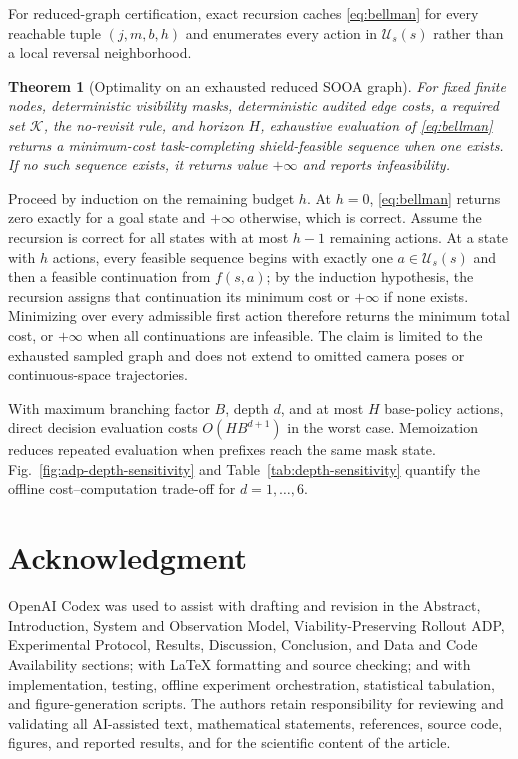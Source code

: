 \documentclass{IEEEtaes}
\newtheorem{theorem}{Theorem}
\theoremstyle{remark}
\theoremstyle{plain}
\begin{document}
For reduced-graph certification, exact recursion caches \eqref{eq:bellman} for every reachable tuple $(j,m,b,h)$ and enumerates every action in $\mathcal U_s(s)$ rather than a local reversal neighborhood.

\begin{theorem}[Optimality on an exhausted reduced SOOA graph]
\label{thm:reduced-optimality}
For fixed finite nodes, deterministic visibility masks, deterministic audited edge costs, a required set $\mathcal K$, the no-revisit rule, and horizon $H$, exhaustive evaluation of \eqref{eq:bellman} returns a minimum-cost task-completing shield-feasible sequence when one exists. If no such sequence exists, it returns value $+\infty$ and reports infeasibility.
\end{theorem}

\begin{IEEEproof}
Proceed by induction on the remaining budget $h$. At $h=0$, \eqref{eq:bellman} returns zero exactly for a goal state and $+\infty$ otherwise, which is correct. Assume the recursion is correct for all states with at most $h-1$ remaining actions. At a state with $h$ actions, every feasible sequence begins with exactly one $a\in\mathcal U_s(s)$ and then a feasible continuation from $f(s,a)$; by the induction hypothesis, the recursion assigns that continuation its minimum cost or $+\infty$ if none exists. Minimizing over every admissible first action therefore returns the minimum total cost, or $+\infty$ when all continuations are infeasible. The claim is limited to the exhausted sampled graph and does not extend to omitted camera poses or continuous-space trajectories.
\end{IEEEproof}

With maximum branching factor $B$, depth $d$, and at most $H$ base-policy actions, direct decision evaluation costs $O(HB^{d+1})$ in the worst case. Memoization reduces repeated evaluation when prefixes reach the same mask state. Fig.~\ref{fig:adp-depth-sensitivity} and Table~\ref{tab:depth-sensitivity} quantify the offline cost--computation trade-off for $d=1,\ldots,6$.



\section*{Acknowledgment}
OpenAI Codex was used to assist with drafting and revision in the Abstract, Introduction, System and Observation Model, Viability-Preserving Rollout ADP, Experimental Protocol, Results, Discussion, Conclusion, and Data and Code Availability sections; with LaTeX formatting and source checking; and with implementation, testing, offline experiment orchestration, statistical tabulation, and figure-generation scripts. The authors retain responsibility for reviewing and validating all AI-assisted text, mathematical statements, references, source code, figures, and reported results, and for the scientific content of the article.
\end{document}
